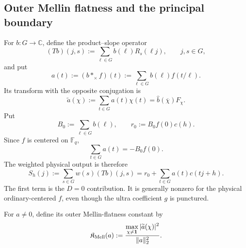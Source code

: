 \subsection{Outer Mellin flatness and the principal boundary}

For \(b:G\to\mathbb C\), define the product--slope operator
\begin{equation}
 (Tb)(j,s):=\sum_{\ell\in G}b(\ell)R_s(\ell j),
 \qquad j,s\in G,
 \label{eq:tpc37-product-slope-operator}
\end{equation}
and put
\begin{equation}
 a(t):=(b*_{\times}f)(t)
 :=\sum_{\ell\in G}b(\ell)f(t/\ell).
 \label{eq:tpc37-outer-convolution}
\end{equation}
Its transform with the opposite conjugation is
\begin{equation}
 \widetilde a(\chi)
 :=\sum_{t\in G}a(t)\chi(t)
 =\widehat b(\overline\chi)F_\chi.
 \label{eq:tpc37-a-transform}
\end{equation}
Put
\begin{equation}
 B_0:=\sum_{\ell\in G}b(\ell),
 \qquad
 r_0:=B_0f(0)c(h).
 \label{eq:tpc37-principal-outer-boundary}
\end{equation}
Since \(f\) is centered on \(\mathbb F_q\),
\begin{equation}
 \sum_{t\in G}a(t)=-B_0f(0).
 \label{eq:tpc37-a-principal-coordinate}
\end{equation}
The weighted physical output is therefore
\begin{equation}
 S_h(j):=\sum_{s\in G}w(s)(Tb)(j,s)
 =r_0+\sum_{t\in G}a(t)c(tj+h).
 \label{eq:tpc37-affine-core}
\end{equation}
The first term is the \(D=0\) contribution.  It is generally nonzero for
the physical ordinary-centered \(f\), even though the ultra coefficient
\(g\) is punctured.

For \(a\ne0\), define its outer Mellin-flatness constant by
\begin{equation}
 \mathfrak K_{\rm Mell}(a)
 :=\frac{\displaystyle
  \max_{\chi\ne\mathbf1}|\widetilde a(\chi)|^2}
 {\|a\|_2^2}.
 \label{eq:tpc37-Mellin-flatness}
\end{equation}

